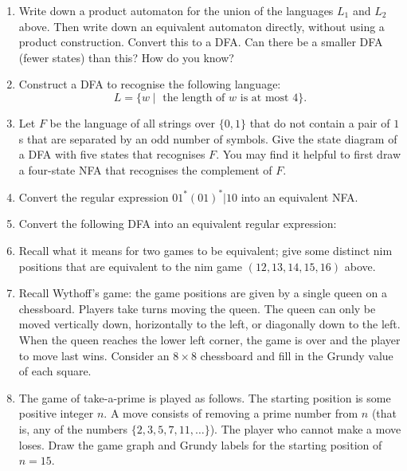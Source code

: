 \documentclass{amsart}
\begin{document}
\begin{enumerate}
\item Write down a product automaton for the union of the languages \(L_1\) and \(L_2\) above.
Then write down an equivalent automaton directly, without using a product construction.
Convert this to a DFA.  Can there be a smaller DFA (fewer states) than this?  How do you know?
\item Construct a DFA to recognise the following language:
\[L = \{w \mid \text{ the length of }w\text{ is at most }4\}.\]
\item Let \(F\) be the language of all strings over \(\{0,1\}\) that do not contain a pair of \(1\)s that are separated by an odd number of symbols. Give the state diagram of a DFA with five states that recognises \(F\).
You may find it helpful to first draw a four-state NFA that recognises the complement of \(F\).
\item Convert the regular expression \(01^*(01)^*|10\) into an equivalent NFA.
\item Convert the following DFA into an equivalent regular expression:
\begin{center}
\end{center}
\item Recall what it means for two games to be equivalent; give some distinct nim positions that are equivalent to the nim game \((12,13,14,15,16)\) above.
\item Recall Wythoff's game: the game positions are given by a single queen on a chessboard. Players take turns moving the queen. The queen can only be moved vertically down, horizontally to the left, or diagonally down to the left.
When the queen reaches the lower left corner, the game is over and the player to move last wins.
Consider an \(8 \times 8\) chessboard and fill in the Grundy value of each square.
\item The game of take-a-prime is played as follows. The starting position is some positive integer \(n\). A move consists of removing a prime number from \(n\) (that is, any of the numbers \(\{2,3,5,7,11,\ldots\}\)). The player who cannot make a move loses. Draw the game graph and Grundy labels for the starting position of \(n = 15\).

\end{enumerate}
\end{document}
